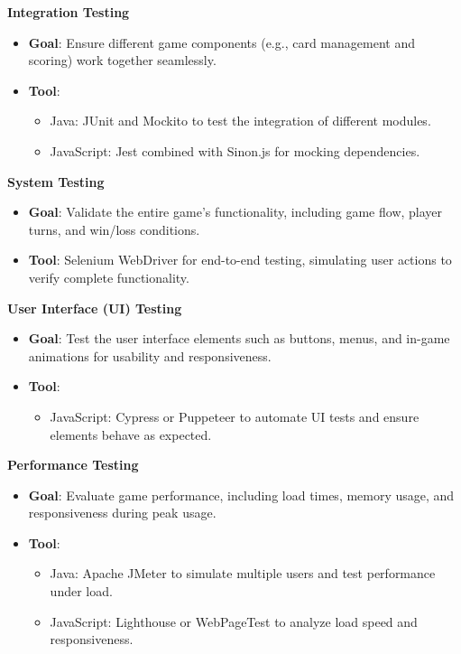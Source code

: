 \documentclass[12pt, titlepage]{article}
\begin{document}
\textbf{Integration Testing}
\begin{itemize}
    \item \textbf{Goal}: Ensure different game components (e.g., card management and scoring) work together seamlessly.
    \item \textbf{Tool}:
    \begin{itemize}
        \item Java: JUnit and Mockito to test the integration of different modules.
        \item JavaScript: Jest combined with Sinon.js for mocking dependencies.
    \end{itemize}
\end{itemize}

\textbf{System Testing}
\begin{itemize}
    \item \textbf{Goal}: Validate the entire game’s functionality, including game flow, player turns, and win/loss conditions.
    \item \textbf{Tool}: Selenium WebDriver for end-to-end testing, simulating user actions to verify complete functionality.
\end{itemize}

\textbf{User Interface (UI) Testing}
\begin{itemize}
    \item \textbf{Goal}: Test the user interface elements such as buttons, menus, and in-game animations for usability and responsiveness.
    \item \textbf{Tool}:
    \begin{itemize}
        \item JavaScript: Cypress or Puppeteer to automate UI tests and ensure elements behave as expected.
    \end{itemize}
\end{itemize}

\textbf{Performance Testing}
\begin{itemize}
    \item \textbf{Goal}: Evaluate game performance, including load times, memory usage, and responsiveness during peak usage.
    \item \textbf{Tool}:
    \begin{itemize}
        \item Java: Apache JMeter to simulate multiple users and test performance under load.
        \item JavaScript: Lighthouse or WebPageTest to analyze load speed and responsiveness.
    \end{itemize}
\end{itemize}
\end{document}
